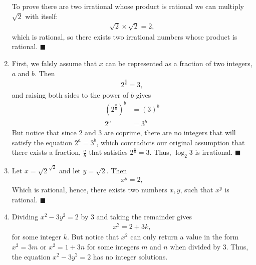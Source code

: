 \documentclass[12pt]{article}
\begin{document}
\begin{enumerate}
          To prove there are two irrational whose product is rational we can multiply
          $\sqrt2$ with itself:
          \begin{align*}
            \sqrt2 \times \sqrt2 = 2,
          \end{align*}
          which is rational, so there exists two irrational numbers whose product
          is rational. \hfill $\blacksquare$
          \item First, we falsly assume that $x$ can be represented as a fraction
          of two integers, $a$ and $b$. Then 
          \begin{align*}
            2^\frac{a}{b} = 3,
          \end{align*}
          and raising both sides to the power of $b$ gives
          \begin{align*}
            (2^\frac{a}{b})^b &= (3)^b \\
            2^a &= 3^b
          \end{align*}
          But notice that since 2 and 3 are coprime, there are no integers that 
          will satisfy the equation $2^a = 3^b$, which contradicts our original 
          assumption that there exists a fraction, $\frac{a}{b}$ that satisfies
          $2^\frac{a}{b} = 3$. Thus, $\log_{2}3$ is irrational. \hfill $\blacksquare$
          \item Let $x = \sqrt2^{\sqrt2}$ and let $y = \sqrt2$. Then 
          \begin{align*}
            x^y = 2,
          \end{align*}
          Which is rational, hence, there exists two numbers $x,y$, such that 
          $x^y$ is rational. \hfill $\blacksquare$
          \item Dividing $x^2 -3y^2 = 2$ by 3 and taking the remainder gives 
          \begin{align*}
            x^2 = 2 + 3k,
          \end{align*}
          for some integer $k$. But notice that $x^2$ can only return a value 
          in the form $x^2 = 3m$ or $x^2 = 1 + 3n$ for some integers $m$ and $n$
          when divided by 3. Thus, the equation $x^2-3y^2 = 2$ has no integer 
          solutions.
\end{enumerate}
\end{document}

